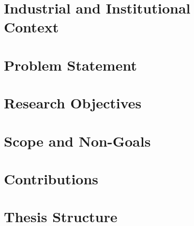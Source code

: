 \documentclass[a4paper,twoside]{sapthesis}
\begin{document}
\section{Industrial and Institutional Context}
\label{sec:industrial-context}

\section{Problem Statement}
\label{sec:problem-statement}

\section{Research Objectives}
\label{sec:objectives}

\section{Scope and Non-Goals}
\label{sec:scope-nongoals}

\section{Contributions}
\label{sec:contributions}

\section{Thesis Structure}
\label{sec:thesis-structure}
\end{document}

